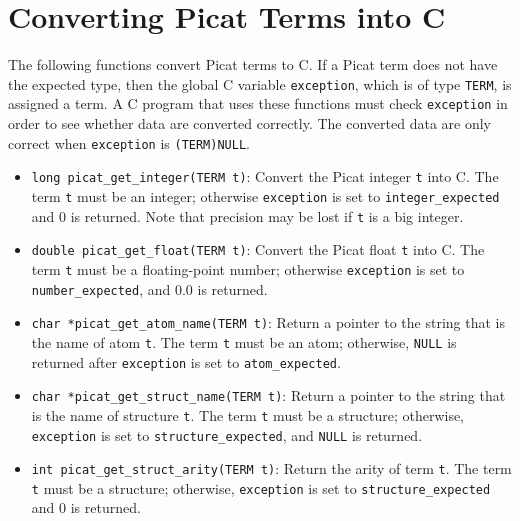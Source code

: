 \section{Converting Picat Terms into C}
The following functions convert Picat terms to C. If a Picat term does not have the expected type, then the global C variable \texttt{exception}, which is of type \texttt{TERM}, is assigned a term. A C program that uses these functions must check \texttt{exception} in order to see whether data are converted correctly. The converted data are only correct when \texttt{exception} is \texttt{(TERM)NULL}.

\begin{itemize}
\item \texttt{long picat\_get\_integer(TERM t)}: Convert the Picat integer \texttt{t} into C. The term \texttt{t} must be an integer; otherwise \texttt{exception} is set to \texttt{integer\_expected} and 0 is returned. Note that precision may be lost if \texttt{t} is a big integer.

\item \texttt{double picat\_get\_float(TERM t)}: Convert the Picat float \texttt{t} into C. The term \texttt{t} must be a floating-point number; otherwise \texttt{exception} is set to \texttt{number\_expected}, and 0.0 is returned. 

\item \texttt{char *picat\_get\_atom\_name(TERM t)}: Return a pointer to the string that is the name of atom \texttt{t}. The term \texttt{t} must be an atom; otherwise, \texttt{NULL} is returned after \newline \texttt{exception} is set to \texttt{atom\_expected}.

\item \texttt{char *picat\_get\_struct\_name(TERM t)}: Return a pointer to the string that is the name of structure \texttt{t}. The term \texttt{t} must be a structure; otherwise, \texttt{exception} is set to \texttt{structure\_expected}, and \texttt{NULL} is returned. 

\item \texttt{int picat\_get\_struct\_arity(TERM t)}: Return the arity of term \texttt{t}.  The term \texttt{t} must be a structure; otherwise, \texttt{exception} is set to \texttt{structure\_expected} and 0 is returned.
\end{itemize}

